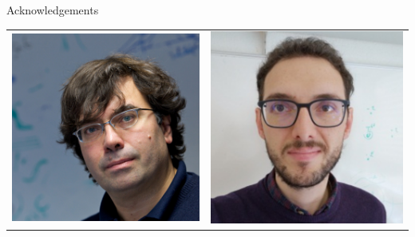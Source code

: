 \documentclass[xcolor=table,aspectratio=169]{beamer}
\numberwithin{equation}{section}
\begin{document}

\begingroup
{}
\begin{frame}{Acknowledgements}
   \begin{center}
      \footnotesize
      \begin{tabularx}{0.5\textwidth}{CC}
         \includegraphics[height = 0.3\paperheight]{photos/nicola_marzari.jpg}  &
         \includegraphics[height = 0.3\paperheight]{photos/nicola_colonna.png} \\

\end{tabularx}
\end{center}
\end{frame}
\end{document}
